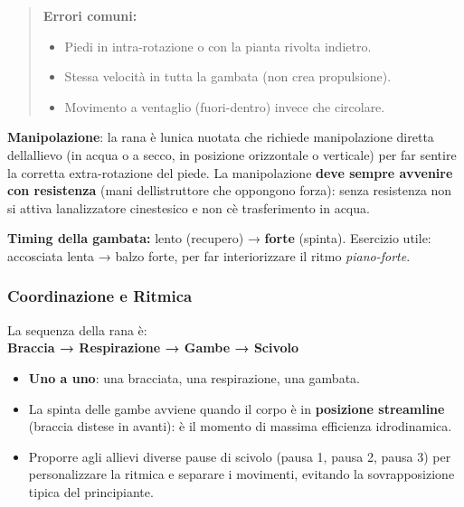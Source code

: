 \documentclass[a4paper,11pt]{article}
\providecommand{\tightlist}{%
  \setlength{\itemsep}{0pt}\setlength{\parskip}{0pt}}
\begin{document}
\begin{quote}
      \textbf{Errori comuni:}

      \begin{itemize}
            \tightlist
            \item
                  Piedi in intra-rotazione o con la pianta rivolta indietro.
            \item
                  Stessa velocità in tutta la gambata (non crea propulsione).
            \item
                  Movimento a ventaglio (fuori-dentro) invece che circolare.
      \end{itemize}
\end{quote}

\textbf{Manipolazione}: la rana è l\textquotesingle unica nuotata che
richiede manipolazione diretta dell\textquotesingle allievo (in acqua o
a secco, in posizione orizzontale o verticale) per far sentire la
corretta extra-rotazione del piede. La manipolazione \textbf{deve sempre
      avvenire con resistenza} (mani dell\textquotesingle istruttore che
oppongono forza): senza resistenza non si attiva
l\textquotesingle analizzatore cinestesico e non c\textquotesingle è
trasferimento in acqua.

\textbf{Timing della gambata:} lento (recupero) → \textbf{forte}
(spinta). Esercizio utile: accosciata lenta → balzo forte, per far
interiorizzare il ritmo \emph{piano-forte}.

\subsubsection{Coordinazione e Ritmica}\label{coordinazione-e-ritmica}

La sequenza della rana è:\\
\textbf{Braccia → Respirazione → Gambe → Scivolo}

\begin{itemize}
      \tightlist
      \item
            \textbf{Uno a uno}: una bracciata, una respirazione, una gambata.
      \item
            La spinta delle gambe avviene quando il corpo è in \textbf{posizione
                  streamline} (braccia distese in avanti): è il momento di massima
            efficienza idrodinamica.
      \item
            Proporre agli allievi diverse pause di scivolo (pausa 1, pausa 2,
            pausa 3) per personalizzare la ritmica e separare i movimenti,
            evitando la sovrapposizione tipica del principiante.
\end{itemize}
\end{document}
